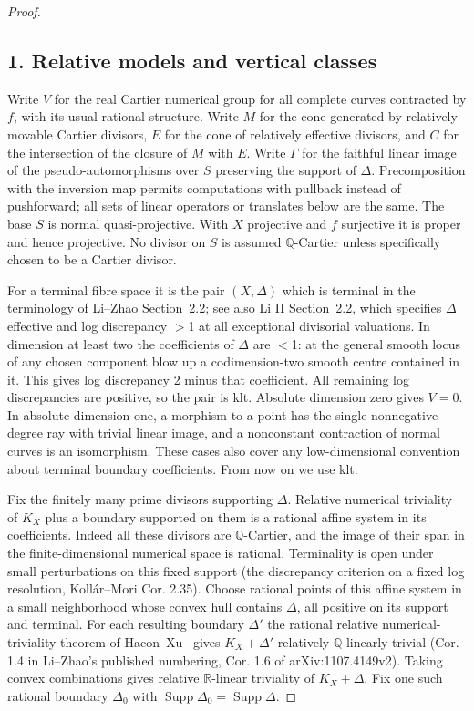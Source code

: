 \documentclass[11pt]{article}
\begin{document}
\begin{proof}
\subsection*{1. Relative models and vertical classes}

Write \(V\) for the real Cartier numerical group for all complete curves contracted by \(f\), with its
usual rational structure. Write \(M\) for the cone generated by relatively movable Cartier divisors,
\(E\) for the cone of relatively effective divisors, and \(C\) for the intersection of the closure of
\(M\) with \(E\). Write \(\Gamma\) for the faithful linear image of the pseudo-automorphisms over \(S\)
preserving the support of \(\Delta\). Precomposition with the inversion map permits computations with
pullback instead of pushforward; all sets of linear operators or translates below are the same. The base
\(S\) is normal quasi-projective. With \(X\) projective and \(f\) surjective it is proper and hence
projective. No divisor on \(S\) is assumed \(\mathbb Q\)-Cartier unless specifically chosen to be a
Cartier divisor.

For a terminal fibre space it is the pair \((X,\Delta)\) which is terminal in the terminology of Li--Zhao
Section~2.2; see also Li II Section~2.2, which specifies \(\Delta\) effective and log discrepancy
$>$1 at all exceptional divisorial valuations. In dimension at least two the coefficients of
\(\Delta\) are $<$1: at the general smooth locus of any chosen component blow up a
codimension-two smooth centre contained in it. This gives log discrepancy 2 minus that coefficient. All
remaining log discrepancies are positive, so the pair is klt. Absolute dimension zero gives \(V=0\). In
absolute dimension one, a morphism to a point has the single nonnegative degree ray with trivial linear
image, and a nonconstant contraction of normal curves is an isomorphism. These cases also cover any
low-dimensional convention about terminal boundary coefficients. From now on we use klt.

Fix the finitely many prime divisors supporting \(\Delta\). Relative numerical triviality of \(K_X\) plus
a boundary supported on them is a rational affine system in its coefficients. Indeed all these divisors
are \(\mathbb Q\)-Cartier, and the image of their span in the finite-dimensional numerical space is
rational. Terminality is open under small perturbations on this fixed support (the discrepancy criterion
on a fixed log resolution, Kollár--Mori Cor. 2.35). Choose rational points of this affine system in a
small neighborhood whose convex hull contains \(\Delta\), all positive on its support and terminal. For
each resulting boundary \(\Delta'\) the rational relative numerical-triviality theorem of
Hacon--Xu~\cite{HaconXuNumerical} gives \(K_X+\Delta'\) relatively \(\mathbb Q\)-linearly trivial (Cor.
1.4 in Li--Zhao's published numbering, Cor. 1.6 of arXiv:1107.4149v2). Taking convex combinations gives
relative \(\mathbb R\)-linear triviality of \(K_X+\Delta\). Fix one such rational boundary \(\Delta_0\)
with \(\operatorname{Supp}\Delta_0=\operatorname{Supp}\Delta\).


\end{proof}
\end{document}

